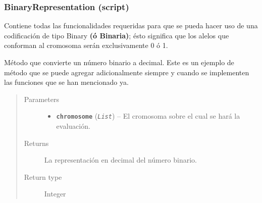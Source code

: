 \documentclass[class=report, crop=false]{standalone}
\begin{document}
\subsubsection{BinaryRepresentation (script)}
\label{sec:a_2_1_1}
Contiene todas las funcionalidades requeridas para que se pueda hacer 
uso de una codificación de tipo Binary \textbf{(ó Binaria)}; ésto 
significa que los alelos que conforman al cromosoma serán exclusivamente 
0 ó 1.

\begin{fulllineitems}

Método que convierte un número binario a decimal.\break
Este es un ejemplo de método que se puede agregar
adicionalmente siempre y cuando se implementen las 
funciones que se han mencionado ya.

\begin{quote}\begin{description}
\item[{Parameters}] \leavevmode\begin{itemize}
\item \textbf{\texttt{chromosome}} (\emph{\texttt{List}}) -- El cromosoma sobre el cual se hará
la evaluación.
\end{itemize}

\item[{Returns}] \leavevmode
La representación en decimal del número binario.
\item[{Return type}] \leavevmode
Integer
\end{description}\end{quote}

\end{fulllineitems}
\end{document}
